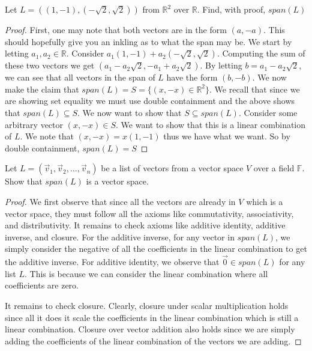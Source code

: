 \begin{exercise}
    Let $L=((1,-1),(-\sqrt{2},\sqrt{2}))$ from $\mathbb{R}^2$ over $\mathbb{R}$. Find, with proof, $span(L)$
\end{exercise}
\begin{proof}
    First, one may note that both vectors are in the form $(a,-a)$. This should hopefully give you an inkling as to what the span may be. We start by letting $a_1,a_2\in\mathbb{R}$. Consider $a_1(1,-1)+a_2(-\sqrt{2},\sqrt{2})$. Computing the sum of these two vectors we get $(a_1-a_2\sqrt{2},-a_1+a_2\sqrt{2})$. By letting $b=a_1-a_2\sqrt{2}$, we can see that all vectors in the span of $L$ have the form $(b,-b)$. We now make the claim that $span(L)=S=\{(x,-x)\in\mathbb{R}^2\}$. We recall that since we are showing set equality we must use double containment and the above shows that $span(L)\subseteq S$. We now want to show that $S\subseteq span(L)$. Consider some arbitrary vector $(x,-x)\in S$. We want to show that this is a linear combination of $L$. We note that $(x,-x)=x(1,-1)$ thus we have what we want. So by double containment, $span(L)=S$
\end{proof}
\begin{exercise}
    Let $L=(\vec{v}_1,\vec{v}_2,\ldots,\vec{v}_n)$ be a list of vectors from a vector space $V$ over a field $\mathbb{F}$. Show that $span(L)$ is a vector space.
\end{exercise}
\begin{proof}
    We first observe that since all the vectors are already in $V$ which is a vector space, they must follow all the axioms like commutativity, associativity, and distributivity. It remains to check axioms like additive identity, additive inverse, and closure. For the additive inverse, for any vector in $span(L)$, we simply consider the negative of all the coefficients in the linear combination to get the additive inverse. For additive identity, we observe that $\vec{0}\in span(L)$ for any list $L$. This is because we can consider the linear combination where all coefficients are zero.

    It remains to check closure. Clearly, closure under scalar multiplication holds since all it does it scale the coefficients in the linear combination which is still a linear combination. Closure over vector addition also holds since we are simply adding the coefficients of the linear combination of the vectors we are adding.
\end{proof}

